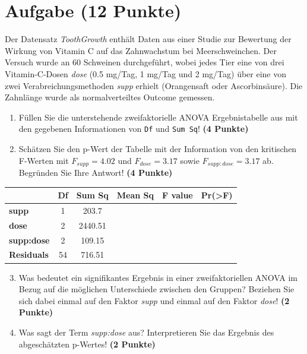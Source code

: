 \documentclass[a4paper, 10pt]{scrartcl}\usepackage[]{graphicx}\usepackage[]{xcolor}
\begin{document}
 
\clearpage

\section{Aufgabe \hfill (12 Punkte)}

Der Datensatz \textit{ToothGrowth} enth{\"a}lt Daten aus einer Studie zur
Bewertung der Wirkung von Vitamin C auf das Zahnwachstum bei
Meerschweinchen. Der Versuch wurde an 60 Schweinen durchgef{\"u}hrt, wobei
jedes Tier eine von drei Vitamin-C-Dosen \textit{dose} (0.5 mg/Tag, 1
mg/Tag und 2 mg/Tag) {\"u}ber eine von zwei Verabreichungsmethoden
\textit{supp} erhielt (Orangensaft oder Ascorbins{\"a}ure). Die Zahnl{\"a}nge wurde
als normalverteiltes Outcome gemessen.



\begin{enumerate}
\item F{\"u}llen Sie die unterstehende zweifaktorielle ANOVA Ergebnistabelle aus
  mit den gegebenen Informationen von \texttt{Df} und \texttt{Sum Sq}!
  \textbf{(4 Punkte)}
\item Sch{\"a}tzen Sie den p-Wert der Tabelle mit der Information von den
  kritischen F-Werten mit
  $F_{supp} = 4.02$ und
  $F_{dose} = 3.17$ sowie
  $F_{supp:dose} = 3.17$ ab. Begr{\"u}nden Sie Ihre
  Antwort! \textbf{(4 Punkte)}
\end{enumerate}

\vspace{1Ex}

\begin{center}
  \Large
  \begin{tabular}{l|c|c|c|c|c}
     & \textbf{Df} & \textbf{Sum Sq} & \textbf{Mean Sq} & \textbf{F value} & \textbf{Pr(>F)} \strut\\
    \hline
   \textbf{supp}  & 1 & 203.7 &  &  &  \strut\\
    \hline
    \textbf{dose}  & 2 & 2440.51 &  &  &  \strut\\
    \hline
    \textbf{supp:dose}  & 2 & 109.15 &  &  &  \strut\\
    \hline
   \textbf{Residuals}  & 54 & 716.51 &  &  &  \strut\\
  \end{tabular}
\end{center}

\vspace{1Ex}

\begin{enumerate}
  \setcounter{enumi}{2}
\item Was bedeutet ein signifikantes Ergebnis in einer zweifaktoriellen
  ANOVA im Bezug auf die m{\"o}glichen Unterschiede zwischen den Gruppen?
  Beziehen Sie sich dabei einmal auf den Faktor \textit{supp} und einmal
  auf den Faktor \textit{dose}! \textbf{(2 Punkte)}
\item Was sagt der Term \textit{supp:dose} aus? Interpretieren Sie das
  Ergebnis des abgesch{\"a}tzten p-Wertes! \textbf{(2 Punkte)}
\end{enumerate}
 
\end{document}
